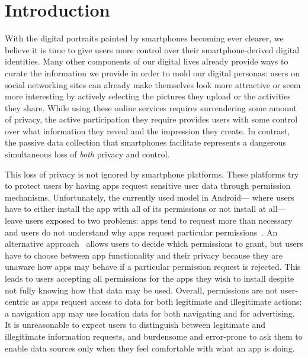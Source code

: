 
\section{Introduction} \label{sec-introduction}

With the digital portraits painted by smartphones becoming ever clearer, we
believe it is time to give users more control over their smartphone-derived
digital identities. Many other components of our digital lives already provide
ways to curate the information we provide in order to mold our digital
personas: users on social networking sites can already make themselves look
more attractive or seem more interesting by actively selecting the pictures
they upload or the activities they share. While using these online services
requires surrendering some amount of privacy, the active participation they
require provides users with some control over what information they reveal and
the impression they create. In contrast, the passive data collection that
smartphones facilitate represents a dangerous simultaneous loss of
\textit{both} privacy and control.


This loss of privacy is not ignored by smartphone platforms. These platforms
try to protect users by having apps request sensitive user data through
permission mechanisms. Unfortunately, the currently used model in Android---
where users have to either install the app with all of its permissions or not
install at all---leave users exposed to two problems: apps tend to request more
than necessary~\cite{taintdroid-osdi,demystified-ccs11} and users do not
understand why apps request particular permissions~\cite{androidperms-soups12}.
An alternative approach~\cite{apex-asiaccs10} allows users to decide which
permissions to grant, but users have to choose between app functionality and
their privacy because they are unaware how apps may behave if a particular
permission request is rejected. This leads to users accepting all permissions
for the apps they wish to install despite not fully knowing how that data may
be used. Overall, permissions are not user-centric as apps request access to
data for both legitimate and illegitimate actions: a navigation app may use
location data for both navigating and for advertising. It is unreasonable to
expect users to distinguish between legitimate and illegitimate information
requests, and burdensome and error-prone to ask them to enable data sources
only when they feel comfortable with what an app is doing.

